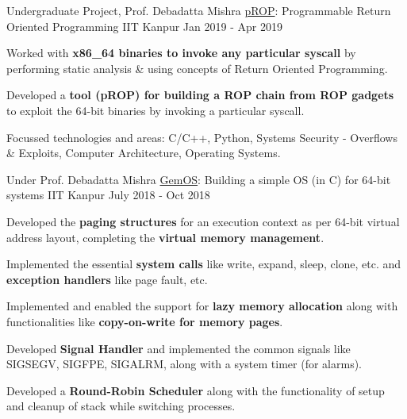 \begin{cventries}
  \cventry
    {Undergraduate Project, Prof. Debadatta Mishra} %
    {\href{https://arxiv.org/abs/2111.03537}{pROP}: Programmable Return Oriented Programming} %
    {IIT Kanpur} %
    {Jan 2019 - Apr 2019} %
    {
      \begin{cvitems} %
      \item {Worked with \textbf{x86\_64 binaries to invoke any particular syscall} by performing static analysis \& using concepts of Return Oriented Programming.}
      \item {Developed a \textbf{tool (pROP) for building a ROP chain from ROP gadgets} to exploit the 64-bit binaries by invoking a particular syscall.}
      \item {Focussed technologies and areas: C/C++, Python, Systems Security - Overflows \& Exploits, Computer Architecture, Operating Systems.}
      \end{cvitems}
    }




  \cventry
    {Under Prof. Debadatta Mishra} %
    {\href{https://dl.acm.org/doi/10.1145/3338698.3338887}{GemOS}: Building a simple OS (in C) for 64-bit systems} %
    {IIT Kanpur} %
    {July 2018 - Oct 2018} %
    {
      \begin{cvitems} %
      \item {Developed the \textbf{paging structures} for an execution context as per 64-bit virtual address layout, completing the \textbf{virtual memory management}.}
      \item {Implemented the essential \textbf{system calls} like write, expand, sleep, clone, etc. and \textbf{exception handlers} like page fault, etc.}
      \item {Implemented and enabled the support for \textbf{lazy memory allocation} along with functionalities like \textbf{copy-on-write for memory pages}.}
      \item {Developed \textbf{Signal Handler} and implemented the common signals like SIGSEGV, SIGFPE, SIGALRM, along with a system timer (for alarms).}
      \item {Developed a \textbf{Round-Robin Scheduler} along with the functionality of setup and cleanup of stack while switching processes.}
      \end{cvitems}
    }


\end{cventries}
